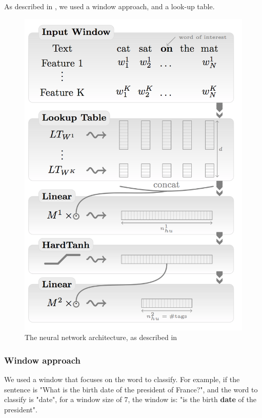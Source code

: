 As described in \cite{collobert}, we used a window approach, and a look-up table.

\begin{figure}[!ht]
  \centering
  \caption{The neural network architecture, as described in \cite{collobert}}
  \label{sandalone:tree_four}
    \includegraphics[scale=0.5]{../NLP-standalone-images/network.png}
\end{figure}

\subsubsection{Window approach}

We used a window that focuses on the word to classify. For example, if the sentence is "What is the birth date of the president of France?", and the word to classify is "date", for a window size of 7, the window is: "is the birth \textbf{date} of the president".

